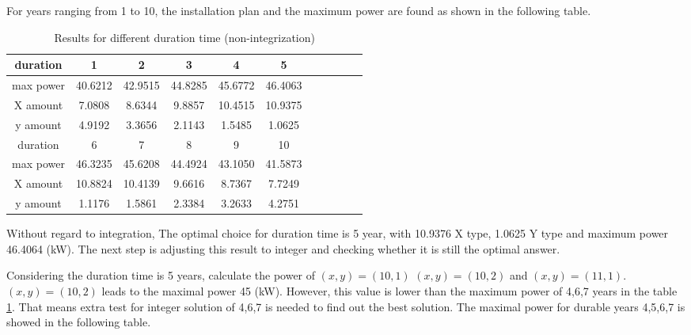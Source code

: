 \documentclass[titlepage,a4paper]{article}
\begin{document}
        For years ranging from 1 to 10, the installation plan and the maximum power are found as shown in the following table.

        \begin{table}[H] 

            \centering

            \begin{tabular}{*{11}{c}}

                \toprule
                duration & 1 & 2 & 3 & 4 & 5  \\
                \midrule
                max power & 40.6212 & 42.9515  & 44.8285 & 45.6772 & 46.4063   \\
                X amount &  7.0808  & 8.6344  & 9.8857 & 10.4515 & 10.9375  \\
                y amount &   4.9192  &  3.3656  &  2.1143  &  1.5485  & 1.0625   \\
                \bottomrule

                \toprule
                duration  & 6 & 7 & 8 & 9 & 10 \\
                \midrule
                max power  & 46.3235 & 45.6208 & 44.4924 & 43.1050 & 41.5873 \\
                X amount  & 10.8824 & 10.4139 & 9.6616 & 8.7367 & 7.7249 \\
                y amount  & 1.1176 &  1.5861 & 2.3384 & 3.2633 & 4.2751 \\
                \bottomrule

            \end{tabular}

            \caption{Results for different duration time (non-integrization)} \label{tables.10 years result}
        \end{table}

        Without regard to integration, The optimal choice for duration time is 5 year, with 10.9376 X type, 1.0625 Y type and maximum power 46.4064 (kW). The next step is adjusting this result to integer and checking whether it is still the optimal answer.

        Considering the duration time is 5 years, calculate the power of $(x,y)=(10,1)$  $(x,y)=(10,2)$ and $(x,y)=(11,1)$. $(x,y)=(10,2)$ leads to the maximal power 45 (kW). However, this value is lower than the maximum power of 4,6,7 years in the table \ref{tables.10 years result}. That means extra test for integer solution of 4,6,7 is needed to find out the best solution. The maximal power for durable years 4,5,6,7 is showed in the following table. 
\end{document}
